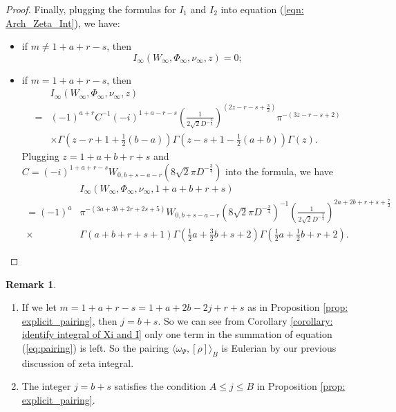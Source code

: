 \documentclass[11pt, a4paper]{amsart}
\theoremstyle{plain}
\theoremstyle{definition}
\newtheorem{remark}[theorem]{Remark}
\numberwithin{equation}{section}
\begin{document}
\begin{proof}
        \par Finally, plugging the formulas for $I_1$ and $I_2$ into equation (\ref{eqn: Arch_Zeta_Int}), we have: 
        \begin{itemize}
            \item if $m \neq 1 + a + r - s$, then
                  \begin{equation*}
                      I_{\infty}(W_{\infty}, \Phi_{\infty}, \nu_{\infty}, z) = 0; 
                  \end{equation*}
            \item if $m = 1 + a + r - s$, then 
            \begin{align*}
                & I_{\infty}(W_{\infty}, \Phi_{\infty}, \nu_{\infty}, z) \\ = & (-1)^{a + r} C^{-1} (-i)^{1 + a - r - s} (\frac{1}{2\sqrt{2}D^{-\frac{3}{4}}})^{(2z -r - s + \frac{3}{2})}\pi^{-(3z - r - s + 2)} \\ & \times \Gamma(z - r + 1 + \frac{1}{2}(b - a)) \Gamma(z - s + 1 - \frac{1}{2} (a + b)) \Gamma(z).
            \end{align*}
            Plugging $z = 1 + a + b + r + s$ and $C = (-i)^{1 + a + r - s}W_{0, b + s - a - r}(8\sqrt{2}\pi D^{-\frac{3}{4}})$ into the formula, we have
            \begin{align*}
                &  I_{\infty}(W_{\infty}, \Phi_{\infty}, \nu_{\infty}, 1 + a + b + r + s) \\
                = (-1)^{a}& \pi^{-(3a + 3b + 2r + 2s + 5)} W_{0, b + s - a - r}(8\sqrt{2}\pi D^{-\frac{3}{4}})^{-1}\left(\frac{1}{2\sqrt{2}D^{-\frac{3}{4}}}\right)^{2a + 2b + r + s + \frac{7}{2}} \\
                \times &\Gamma(a + b + r + s + 1) \Gamma( \frac{1}{2}a + \frac{3}{2}b + s + 2) \Gamma(\frac{1}{2}a + \frac{1}{2} b + r + 2). 
            \end{align*}
        \end{itemize}
    \end{proof}

\begin{remark}
\label{remark: arch_zeta_integral}
    \begin{enumerate}
        \item If we let $m = 1 + a + r - s = 1 + a + 2b -2j + r + s$ as in Proposition \ref{prop: explicit_pairing}, then $j = b + s$. So we can see from Corollary \ref{corollary: identify integral of Xi and I} only one term in the summation of equation (\ref{eq:pairing}) is left. So the pairing $\langle \omega_{\Psi},  [\rho] \rangle_{B}$ is Eulerian by our previous discussion of zeta integral. 
        \item The integer $j = b + s$ satisfies the condition $A \le j \le B$ in Proposition \ref{prop: explicit_pairing}. 
    \end{enumerate}
 
\end{remark}
\end{document}
